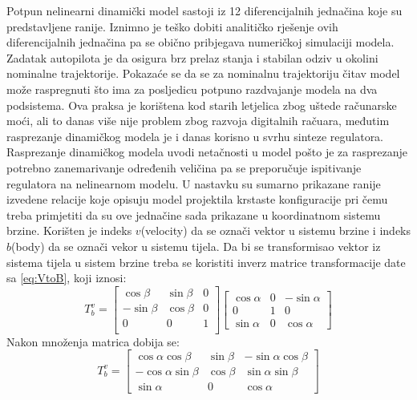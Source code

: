 Potpun nelinearni dinamički model sastoji iz 12 diferencijalnih jednačina koje su predstavljene ranije. 
Iznimno je teško dobiti analitičko rješenje ovih diferencijalnih jednačina pa se obično pribjegava numeričkoj
simulaciji modela. Zadatak autopilota je da osigura brz prelaz stanja i stabilan odziv u okolini nominalne trajektorije. 
Pokazaće se da se za nominalnu trajektoriju čitav model može raspregnuti što ima za posljedicu 
potpuno razdvajanje modela na dva podsistema. Ova praksa je korištena kod starih letjelica zbog 
uštede računarske moći, ali to danas više nije problem zbog razvoja digitalnih račuara, međutim rasprezanje 
dinamičkog modela je i danas korisno u svrhu sinteze regulatora. Rasprezanje dinamičkog modela 
uvodi netačnosti u model pošto je za rasprezanje potrebno zanemarivanje određenih veličina pa se 
preporučuje ispitivanje regulatora na nelinearnom modelu. U nastavku su sumarno prikazane ranije izvedene 
relacije koje opisuju model projektila krstaste konfiguracije pri čemu treba primjetiti da su ove jednačine 
sada prikazane u koordinatnom sistemu brzine. Korišten je indeks $v$(velocity) da se označi vektor u sistemu brzine
i indeks $b$(body) da se označi vekor u sistemu tijela. Da bi se transformisao vektor iz sistema tijela u sistem brzine 
treba se koristiti inverz matrice transformacije date sa \ref{eq:VtoB}, koji iznosi:
\begin{equation}
    T_b^v = \begin{bmatrix}
            \cos\beta & \sin\beta & 0\\
            -\sin\beta & \cos\beta & 0\\
            0 & 0& 1\\
        \end{bmatrix}
        \begin{bmatrix}
            \cos\alpha & 0 & -\sin\alpha \\
        0& 1& 0\\
        \sin\alpha & 0 & \cos\alpha
        \end{bmatrix}
\end{equation}
Nakon množenja matrica dobija se:
\begin{equation}
    T_b^v=\begin{bmatrix}
        \cos\alpha\cos\beta & \sin\beta & -\sin\alpha\cos\beta \\
        -\cos\alpha\sin\beta & \cos\beta & \sin\alpha\sin\beta \\
        \sin\alpha & 0 & \cos\alpha
    \end{bmatrix}
\end{equation}
